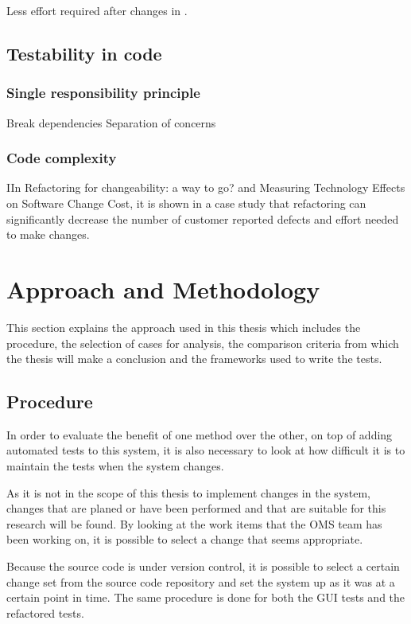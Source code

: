 \documentclass{article}
\begin{document}
			Less effort required after changes in \cite{refactor_for_changeability}.

		\subsection{Testability in code}
			\subsubsection{Single responsibility principle}
			Break dependencies 
			Separation of concerns

			\subsubsection{Code complexity}

			IIn Refactoring for changeability: a way to go? and Measuring Technology Effects on Software Change Cost, it is shown in a case study that refactoring can significantly decrease the number of customer reported defects and effort needed to make changes.


	\section{Approach and Methodology}
		This section explains the approach used in this thesis which includes the procedure, the selection of cases for analysis, the comparison criteria from which the thesis will make a conclusion and the frameworks used to write the tests.

		\subsection{Procedure}
		In order to evaluate the benefit of one method over the other, on top of adding automated tests to this system, it is also necessary to look at how difficult it is to maintain the tests when the system changes. 

		As it is not in the scope of this thesis to implement changes in the system, changes that are planed or have been performed and that are suitable for this research will be found. By looking at the work items that the OMS team has been working on, it is possible to select a change that seems appropriate. 

		Because the source code is under version control, it is possible to select a certain change set from the source code repository and set the system up as it was at a certain point in time.
		The same procedure is done for both the GUI tests and the refactored tests.
\end{document}
